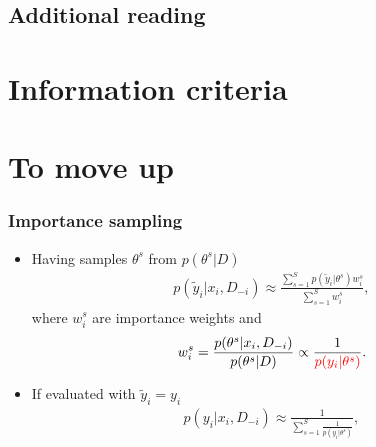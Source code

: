 \documentclass[10pt]{beamer}
\begin{document}
\subsection{Additional reading}


\section{Information criteria}
\frame{\sectionpage}





\section{To move up}
\frame{\sectionpage}















\begin{frame}
  \frametitle{Importance sampling}

   \begin{itemize}
   \item Having samples $\theta^s$ from $p(\theta^s|D)$
     \begin{align*}
       p(\tilde{y}_i|x_i,D_{-i})\approx\frac{\sum_{s=1}^Sp(\tilde{y}_i|\theta^s)w_i^s}{\sum_{s=1}^S w_i^s},
     \end{align*}
     where $w_i^s$ are importance weights and
     \begin{align*}
       w_i^s=\frac{p(\theta^s|x_i,D_{-i})}{p(\theta^s|D)}\propto\frac{1}{\color{red} p(y_i|\theta^s)}.
     \end{align*}
 \pause
   \item If evaluated with $\tilde{y}_i=y_i$
     \begin{align*}
       p(y_i|x_i,D_{-i})\approx\frac{1}{\sum_{s=1}^S\frac{1}{p(y_i|\theta^s)}},
     \end{align*}
   \end{itemize}

 \end{frame}
\end{document}
